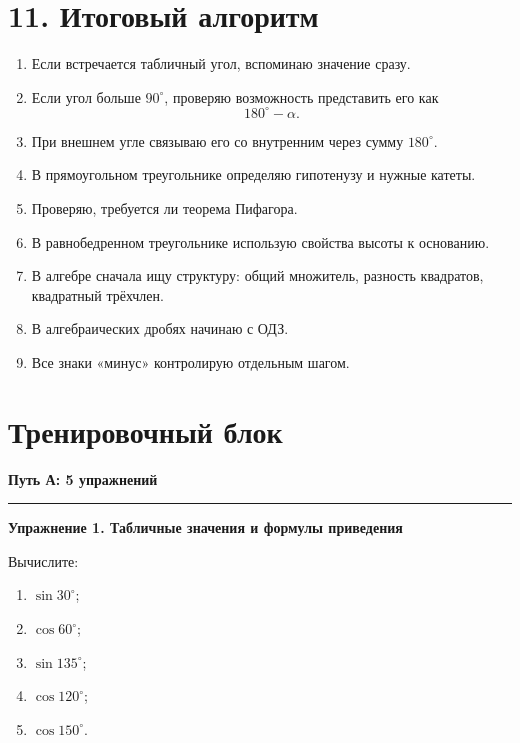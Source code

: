 \documentclass[a4paper,12pt]{article}
\newcommand{\accentline}{%
    \vspace{0.2em}
    {\color{accent}\rule{\linewidth}{0.6pt}}
    \vspace{0.5em}
}
\begin{document}

\section*{\color{darkaccent}11. Итоговый алгоритм}

\begin{enumerate}
    \item Если встречается табличный угол, вспоминаю значение сразу.
    \item Если угол больше $90^\circ$, проверяю возможность представить его как
    \[
    180^\circ-\alpha.
    \]
    \item При внешнем угле связываю его со внутренним через сумму $180^\circ$.
    \item В прямоугольном треугольнике определяю гипотенузу и нужные катеты.
    \item Проверяю, требуется ли теорема Пифагора.
    \item В равнобедренном треугольнике использую свойства высоты к основанию.
    \item В алгебре сначала ищу структуру:
    общий множитель, разность квадратов, квадратный трёхчлен.
    \item В алгебраических дробях начинаю с ОДЗ.
    \item Все знаки «минус» контролирую отдельным шагом.
\end{enumerate}


\clearpage
\section*{\color{darkaccent}Тренировочный блок}

\begin{center}
{\large\bfseries Путь А: 5 упражнений}
\end{center}

\accentline

\textbf{Упражнение 1. Табличные значения и формулы приведения}

Вычислите:

\begin{enumerate}[label=\alph*)]
    \item $\sin30^\circ$;
    \item $\cos60^\circ$;
    \item $\sin135^\circ$;
    \item $\cos120^\circ$;
    \item $\cos150^\circ$.
\end{enumerate}
\end{document}
